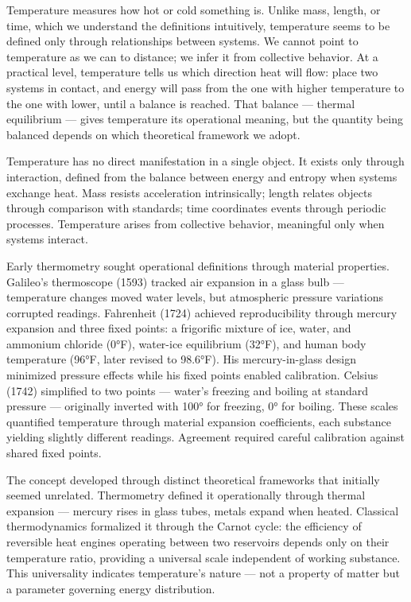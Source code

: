 Temperature measures how hot or cold something is. Unlike mass, length, or time, which we understand the definitions intuitively, temperature seems to be defined only through relationships between systems. We cannot point to temperature as we can to distance; we infer it from collective behavior. At a practical level, temperature tells us which direction heat will flow: place two systems in contact, and energy will pass from the one with higher temperature to the one with lower, until a balance is reached. That balance — thermal equilibrium — gives temperature its operational meaning, but the quantity being balanced depends on which theoretical framework we adopt.

Temperature has no direct manifestation in a single object. It exists only through interaction, defined from the balance between energy and entropy when systems exchange heat. Mass resists acceleration intrinsically; length relates objects through comparison with standards; time coordinates events through periodic processes. Temperature arises from collective behavior, meaningful only when systems interact.

Early thermometry sought operational definitions through material properties. Galileo's thermoscope (1593) tracked air expansion in a glass bulb — temperature changes moved water levels, but atmospheric pressure variations corrupted readings. Fahrenheit (1724) achieved reproducibility through mercury expansion and three fixed points: a frigorific mixture of ice, water, and ammonium chloride (0°F), water-ice equilibrium (32°F), and human body temperature (96°F, later revised to 98.6°F). His mercury-in-glass design minimized pressure effects while his fixed points enabled calibration. Celsius (1742) simplified to two points — water's freezing and boiling at standard pressure — originally inverted with 100° for freezing, 0° for boiling. These scales quantified temperature through material expansion coefficients, each substance yielding slightly different readings. Agreement required careful calibration against shared fixed points.

The concept developed through distinct theoretical frameworks that initially seemed unrelated. Thermometry defined it operationally through thermal expansion — mercury rises in glass tubes, metals expand when heated. Classical thermodynamics formalized it through the Carnot cycle: the efficiency of reversible heat engines operating between two reservoirs depends only on their temperature ratio, providing a universal scale independent of working substance. This universality indicates temperature's nature — not a property of matter but a parameter governing energy distribution.

